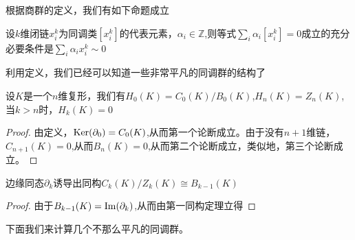 根据商群的定义，我们有如下命题成立
\begin{proposition}
设$k$维闭链$x^{k}_{i}$为同调类$[x^{k}_{i}]$的代表元素，$\alpha_{i}\in \mathbb{Z}$,则等式$\sum\limits_{i}\alpha_{i}[x_{i}^{k}]=0$成立的充分必要条件是$\sum\limits_{i}\alpha_{i}x_{i}^{k}\sim0$
\end{proposition}
利用定义，我们已经可以知道一些非常平凡的同调群的结构了
\begin{proposition}
设$K$是一个$n$维复形，我们有$H_{0}(K)=C_{0}(K)/B_{0}(K)$,$H_{n}(K)=Z_{n}(K)$,当$k>n$时，$H_{k}(K)=0$
\end{proposition}
\begin{proof}
由定义，${\rm Ker}(\partial_{0})=C_{0}(K)$,从而第一个论断成立。由于没有$n+1$维链，$C_{n+1}(K)=0$,从而$B_{n}(K)=0$,从而第二个论断成立，类似地，第三个论断成立。
\end{proof}
\begin{proposition}
边缘同态$\partial_{k}$诱导出同构$C_{k}(K)/Z_{k}(K)\cong B_{k-1}(K)$
\end{proposition}
\begin{proof}
由于$B_{k-1}(K)={\rm Im}(\partial_{k})$,从而由第一同构定理立得
\end{proof}

下面我们来计算几个不那么平凡的同调群。
\begin{figure}[htbp]
    \centering
{}
    \caption{}
    \label{fig:499}
\end{figure}

